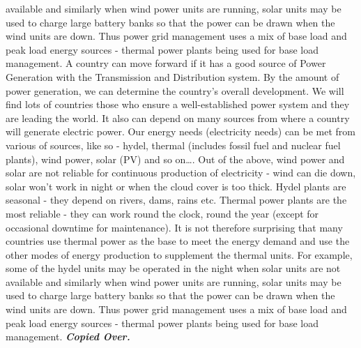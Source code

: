 \documentclass[10pt, a4paper]{article}
\begin{document}
available and similarly when wind power units are running, solar units may be used to charge large battery banks so that the power can be drawn when the wind units are down. Thus power grid management uses a mix of base load and peak load energy sources - thermal power plants being used for base load management. A country can move forward if it has a good source of Power Generation with the Transmission and Distribution system. By the amount of power generation, we can determine the country’s overall development. We will find lots of countries those who ensure a well-established power system and they are leading the world. It also can depend on many sources from where a country will generate electric power. Our energy needs (electricity needs) can be met from various of sources, like so - hydel, thermal (includes fossil fuel and nuclear fuel plants), wind power, solar (PV) and so on\dots. Out of the above, wind power and solar are not reliable for continuous production of electricity - wind can die down, solar won’t work in night or when the cloud cover is too thick. Hydel plants are seasonal - they depend on rivers, dams, rains etc. Thermal power plants are the most reliable - they can work round the clock, round the year (except for occasional downtime for maintenance). It is not therefore surprising that many countries use thermal power as the base to meet the energy demand and use the other modes of energy production to supplement the thermal units. For example, some of the hydel units may be operated in the night when solar units are not available and similarly when wind power units are running, solar units may be used to charge large battery banks so that the power can be drawn when the wind units are down. Thus power grid management uses a mix of base load and peak load energy sources - thermal power plants being used for base load management. \textit{\textbf{Copied Over.}}
\end{document}
